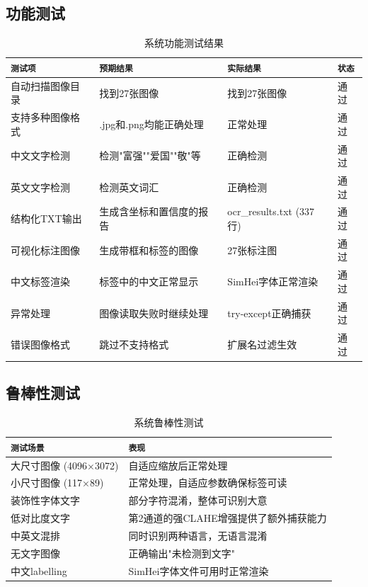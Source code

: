 \documentclass[12pt,hyperref,a4paper,UTF8]{ctexart}
\begin{document}
\subsection{功能测试}

\begin{table}[!htbp]
    \centering
    \begin{tabular}{l|l|l|l}
        \hline
        \texttt{测试项} & \texttt{预期结果} & \texttt{实际结果} & \texttt{状态} \\
        \hline
        自动扫描图像目录 & 找到27张图像 & 找到27张图像 & 通过 \\
        支持多种图像格式 & .jpg和.png均能正确处理 & 正常处理 & 通过 \\
        中文文字检测 & 检测"富强""爱国""敬"等 & 正确检测 & 通过 \\
        英文文字检测 & 检测英文词汇 & 正确检测 & 通过 \\
        结构化TXT输出 & 生成含坐标和置信度的报告 & ocr\_results.txt (337行) & 通过 \\
        可视化标注图像 & 生成带框和标签的图像 & 27张标注图 & 通过 \\
        中文标签渲染 & 标签中的中文正常显示 & SimHei字体正常渲染 & 通过 \\
        异常处理 & 图像读取失败时继续处理 & try-except正确捕获 & 通过 \\
        错误图像格式 & 跳过不支持格式 & 扩展名过滤生效 & 通过 \\
        \hline
    \end{tabular}
    \caption{系统功能测试结果}
    \label{tab:func_test}
\end{table}

\subsection{鲁棒性测试}

\begin{table}[!htbp]
    \centering
    \begin{tabular}{l|l}
        \hline
        \texttt{测试场景} & \texttt{表现} \\
        \hline
        大尺寸图像 (4096×3072) & 自适应缩放后正常处理 \\
        小尺寸图像 (117×89) & 正常处理，自适应参数确保标签可读 \\
        装饰性字体文字 & 部分字符混淆，整体可识别大意 \\
        低对比度文字 & 第2通道的强CLAHE增强提供了额外捕获能力 \\
        中英文混排 & 同时识别两种语言，无语言混淆 \\
        无文字图像 & 正确输出"未检测到文字" \\
        中文labelling & SimHei字体文件可用时正常渲染 \\
        \hline
    \end{tabular}
    \caption{系统鲁棒性测试}
    \label{tab:robust_test}
\end{table}
\end{document}
